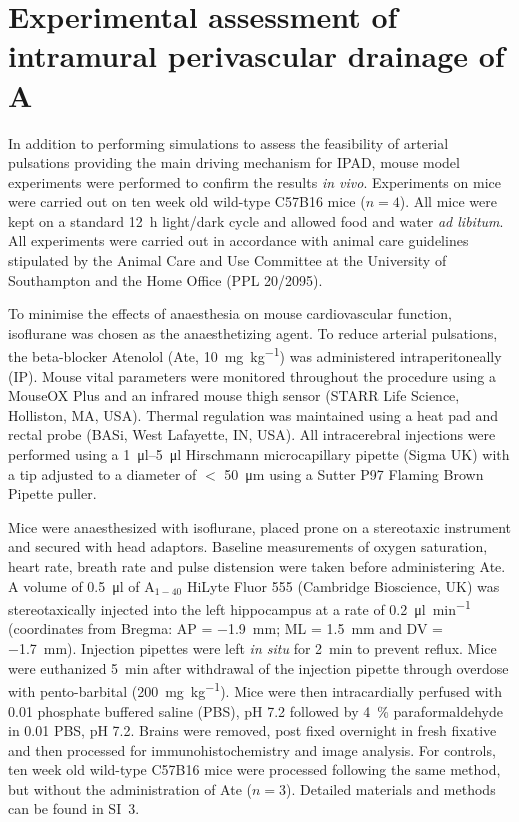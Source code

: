 \documentclass{frontiersFPHY} %
\newcommand{\Ab}{A\textbeta\xspace}
\begin{document}
\section{Experimental assessment of intramural perivascular drainage of \Ab}

In addition to performing simulations to assess the feasibility of arterial pulsations providing the main driving mechanism for IPAD, mouse model experiments were performed to confirm the results \textit{in vivo}. Experiments on mice were carried out on ten week old wild-type C57B16 mice ($n = 4$). All mice were kept on a standard \SI{12}{\hour} light/dark cycle and allowed food and water \textit{ad libitum}. All experiments were carried out in accordance with animal care guidelines stipulated by the Animal Care and Use Committee at the University of Southampton and the Home Office (PPL 20/2095).

To minimise the effects of anaesthesia on mouse cardiovascular function, isoflurane was chosen as the anaesthetizing agent. To reduce arterial pulsations, the beta-blocker Atenolol (Ate, \SI{10}{\milli\gram\per\kilo\gram}) was administered intraperitoneally (IP). Mouse vital parameters were monitored throughout the procedure using a MouseOX Plus and an infrared mouse thigh sensor (STARR Life Science, Holliston, MA, USA). Thermal regulation was maintained using a heat pad and rectal probe (BASi, West Lafayette, IN, USA). All intracerebral injections were performed using a \SIrange{1}{5}{\micro\litre} Hirschmann microcapillary pipette (Sigma UK) with a tip adjusted to a diameter of $<$ \SI{50}{\micro\metre} using a Sutter P97 Flaming Brown Pipette puller.

Mice were anaesthesized with isoflurane, placed prone on a stereotaxic instrument and secured with head adaptors. Baseline measurements of oxygen saturation, heart rate, breath rate and pulse distension were taken before administering Ate. A volume of \SI{0.5}{\micro\litre} of \Ab$_{1-40}$ HiLyte Fluor 555 (Cambridge Bioscience, UK) was stereotaxically injected into the left hippocampus at a rate of \SI{0.2}{\micro\litre\per\minute} (coordinates from Bregma: AP = \SI{-1.9}{\mm}; ML = \SI{1.5}{\mm} and DV = \SI{-1.7}{\mm}). Injection pipettes were left \textit{in situ} for \SI{2}{\minute} to prevent reflux. Mice were euthanized \SI{5}{\minute} after withdrawal of the injection pipette through overdose with pento-barbital (\SI{200}{\milli\gram\per\kilo\gram}). Mice were then intracardially perfused with \SI{0.01}{\Molar} phosphate buffered saline (PBS), pH 7.2 followed by \SI{4}{\percent} paraformaldehyde in \SI{0.01}{\Molar} PBS, pH 7.2. Brains were removed, post fixed overnight in fresh fixative and then processed for immunohistochemistry and image analysis. For controls, ten week old wild-type C57B16 mice were processed following the same method, but without the administration of Ate ($n = 3$). Detailed materials and methods can be found in SI~3.
\end{document}
